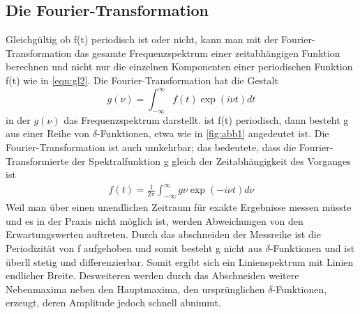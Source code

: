 \subsection{Die Fourier-Transformation}
Gleichgültig ob f(t) periodisch ist oder nicht, kann man mit der Fourier-Transformation das gesamte Frequenzspektrum einer zeitabhängigen Funktion berechnen 
und nicht nur die einzelnen Komponenten einer periodischen Funktion f(t) wie in \ref{eqn:gl2}.
Die Fourier-Transformation hat die Gestalt
\begin{equation}
  g(\nu) = \int_{-\infty}^{\infty} f(t) \exp{(i \nu t)} dt \label{eqn:gl3}
\end{equation}
in der $g(\nu)$ das Frequenzspektrum darstellt.
ist f(t) periodisch, dann besteht g aus einer Reihe von $\delta$-Funktionen, etwa wie in \ref{fig:abb1} angedeutet ist.
Die Fourier-Transformation ist auch umkehrbar; das bedeutete, dass die Fourier-Transformierte der Spektralfunktion g gleich der Zeitabhängigkeit des Vorganges ist
\begin{align}
  f(t) = \frac{1}{2 \pi} \int_{-\infty}^{\infty} g{\nu} \exp{(-i \nu t)} d \nu
\end{align}
Weil man über einen unendlichen Zeitraum für exakte Ergebnisse messen müsste und es in der Praxis nicht möglich ist, werden Abweichungen von den Erwartungswerten auftreten.
Durch das abschneiden der Messreihe ist die Periodizität von f aufgehoben und somit besteht g nicht aus $\delta$-Funktionen und ist überll stetig und differenzierbar.
Somit ergibt sich ein Linienspektrum mit Linien endlicher Breite.
Desweiteren werden durch das Abschneiden weitere Nebenmaxima neben den Hauptmaxima, den ursprünglichen $\delta$-Funktionen, erzeugt, deren Amplitude jedoch schnell abnimmt.
